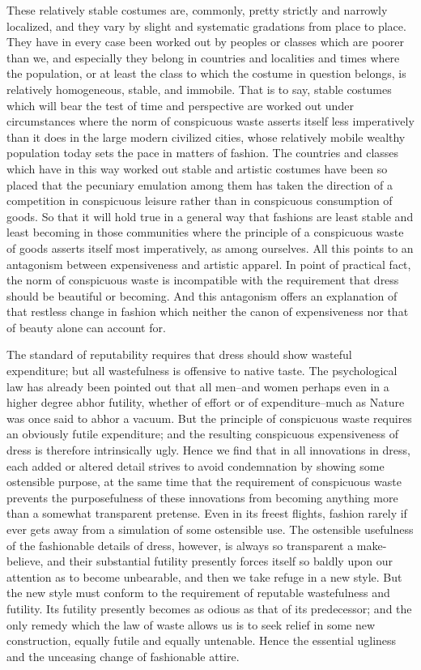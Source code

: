 \documentclass[12pt]{report}
\begin{document}
These relatively stable costumes are, commonly, pretty strictly and
narrowly localized, and they vary by slight and systematic gradations
from place to place. They have in every case been worked out by peoples
or classes which are poorer than we, and especially they belong in
countries and localities and times where the population, or at least
the class to which the costume in question belongs, is relatively
homogeneous, stable, and immobile. That is to say, stable costumes
which will bear the test of time and perspective are worked out under
circumstances where the norm of conspicuous waste asserts itself less
imperatively than it does in the large modern civilized cities, whose
relatively mobile wealthy population today sets the pace in matters of
fashion. The countries and classes which have in this way worked out
stable and artistic costumes have been so placed that the pecuniary
emulation among them has taken the direction of a competition in
conspicuous leisure rather than in conspicuous consumption of goods. So
that it will hold true in a general way that fashions are least stable
and least becoming in those communities where the principle of a
conspicuous waste of goods asserts itself most imperatively, as among
ourselves. All this points to an antagonism between expensiveness and
artistic apparel. In point of practical fact, the norm of conspicuous
waste is incompatible with the requirement that dress should be
beautiful or becoming. And this antagonism offers an explanation of that
restless change in fashion which neither the canon of expensiveness nor
that of beauty alone can account for.

The standard of reputability requires that dress should show wasteful
expenditure; but all wastefulness is offensive to native taste. The
psychological law has already been pointed out that all men--and women
perhaps even in a higher degree abhor futility, whether of effort or
of expenditure--much as Nature was once said to abhor a vacuum. But the
principle of conspicuous waste requires an obviously futile expenditure;
and the resulting conspicuous expensiveness of dress is therefore
intrinsically ugly. Hence we find that in all innovations in dress, each
added or altered detail strives to avoid condemnation by showing some
ostensible purpose, at the same time that the requirement of conspicuous
waste prevents the purposefulness of these innovations from becoming
anything more than a somewhat transparent pretense. Even in its freest
flights, fashion rarely if ever gets away from a simulation of some
ostensible use. The ostensible usefulness of the fashionable details
of dress, however, is always so transparent a make-believe, and
their substantial futility presently forces itself so baldly upon our
attention as to become unbearable, and then we take refuge in a new
style. But the new style must conform to the requirement of reputable
wastefulness and futility. Its futility presently becomes as odious
as that of its predecessor; and the only remedy which the law of waste
allows us is to seek relief in some new construction, equally futile and
equally untenable. Hence the essential ugliness and the unceasing change
of fashionable attire.
\end{document}
